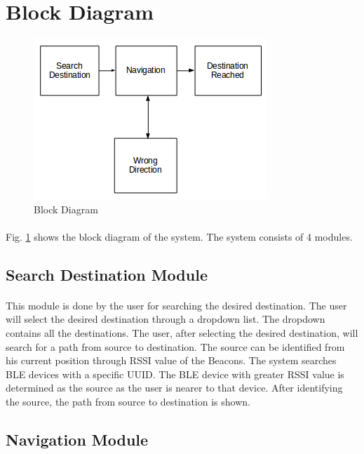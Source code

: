 \documentclass[a4paper,12pt]{report}
\begin{document}
\section{Block Diagram}
\begin{figure}[!h]
	\begin{center}
		\includegraphics[width=.75\textwidth]{BD.png}    
		\caption{Block Diagram}
		\label{fig3}
	\end{center}
\end{figure}
\paragraph{} Fig. \ref{fig3} shows the block diagram of the system. The system consists of 4 modules.
\subsection{Search Destination Module}
\paragraph{}This module is done by the user for searching the desired destination. The user will select the desired destination through a dropdown list. The dropdown contains all the destinations. The user, after selecting the desired destination, will search for a path from source to destination. The source can be identified from his current position through RSSI value of the Beacons. The system searches BLE devices with a specific UUID. The BLE device with greater RSSI value is determined as the source as the user is nearer to that device. After identifying the source, the path from source to destination is shown. 
\subsection{Navigation Module}
\end{document}
